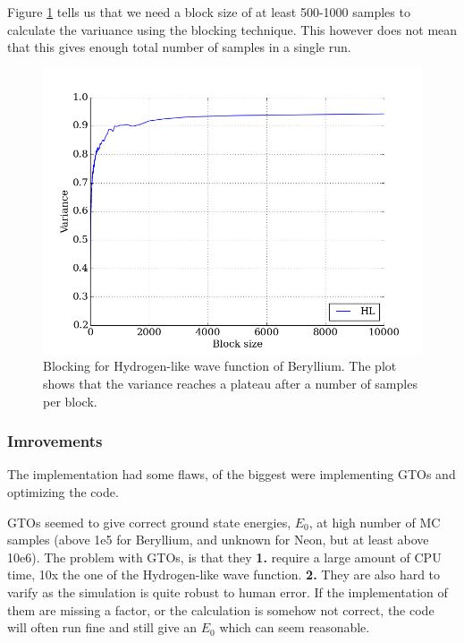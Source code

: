 \documentclass[twocolumns, a4paper,11pt,fleqn]{extarticle}
\begin{document}
Figure \ref{fig:beryllium_02} tells us that we need a block size
of at least 500-1000 samples to calculate the variuance using the blocking technique.
This however does not mean that this gives enough total number of samples
in a single run.

\begin{figure}[H]
	\includegraphics[width=\columnwidth]{../res/plot/beryllium_02/beryllium_02_pretty.png}
	\caption{Blocking for Hydrogen-like wave function of Beryllium.
	The plot shows that the variance reaches a plateau after a number of
	samples per block.}
	\label{fig:beryllium_02}
\end{figure}

\subsubsection{Imrovements}
The implementation had some flaws, of the biggest were implementing GTOs 
and optimizing the code.\\


\noindent GTOs seemed to give correct ground state energies, $E_0$, 
at high number of MC samples (above 1e5 for Beryllium, and unknown for Neon, but at least
above 10e6). 
The problem with GTOs, is that they 
{\color{MediumBlue}\bf1.} require a large amount
of CPU time, 10x the one of the Hydrogen-like wave function. {\color{MediumBlue}\bf2.}
They are also hard to varify as the simulation is quite robust to human error. If 
the implementation of them are missing a factor, or the calculation is somehow not
correct, the code will often run fine and still give an $E_0$ which can seem reasonable. 
\end{document}
